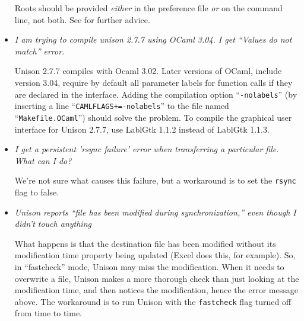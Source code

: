 \begin{itemize}
Roots should be provided {\em either} in the preference file {\em or} on
the command line, not both.  See  for further advice.

\item {\em I am trying to compile unison 2.7.7 using OCaml 3.04.  I get ``Values do not match'' error.}
  
  Unison 2.7.7 compiles with Ocaml 3.02.  Later versions of OCaml,
  include version 3.04, require by default all parameter labels for
  function calls if they are declared in the interface.  Adding the
  compilation option ``\verb|-nolabels|'' (by inserting a line
  ``\verb|CAMLFLAGS+=-nolabels|'' to the file named ``\verb|Makefile.OCaml|'')
  should solve the problem.  To compile the graphical user interface for Unison 2.7.7, use LablGtk 1.1.2 instead of LablGtk 1.1.3.

\item {\em I get a persistent 'rsync failure' error when transferring a
  particular file.  What can I do?}

We're not sure what causes this failure, but a workaround is to set the
{\tt rsync} flag to false.

\item {\em Unison reports ``file has been modified during synchronization,''
  even though I didn't touch anything}

What happens is that the destination file has been modified without its
modification time property being updated (Excel does this, for example).
So, in ``fastcheck'' mode, Unison may miss the modification.  When it needs
to overwrite a file, Unison makes a more thorough check than just looking at
the modification time, and then notices the modification, hence the error
message above.  The workaround is to run Unison with the {\tt fastcheck}
flag turned off from time to time.

\end{itemize}


